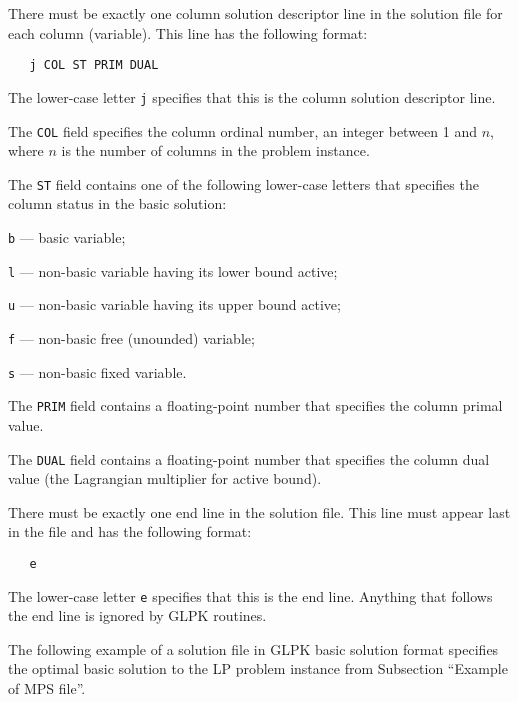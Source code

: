 There must be exactly one column
solution descriptor line in the solution file for each column
(variable). This line has the following format:

\begin{verbatim}
   j COL ST PRIM DUAL
\end{verbatim}

The lower-case letter \verb|j| specifies that this is the column
solution descriptor line.

The \verb|COL| field specifies the column ordinal number, an integer
between 1 and $n$, where $n$ is the number of columns in the problem
instance.

The \verb|ST| field contains one of the following lower-case letters
that specifies the column status in the basic solution:

\verb|b| --- basic variable;

\verb|l| --- non-basic variable having its lower bound active;

\verb|u| --- non-basic variable having its upper bound active;

\verb|f| --- non-basic free (unounded) variable;

\verb|s| --- non-basic fixed variable.

The \verb|PRIM| field contains a floating-point number that specifies
the column primal value.

The \verb|DUAL| field contains a floating-point number that specifies
the column dual value (the Lagrangian multiplier for active bound).

 There must be exactly one end line in the solution
file. This line must appear last in the file and has the following
format:

\begin{verbatim}
   e
\end{verbatim}

The lower-case letter \verb|e| specifies that this is the end line.
Anything that follows the end line is ignored by GLPK routines.


The following example of a solution file in GLPK basic solution format
specifies the optimal basic solution to the LP problem instance from
Subsection ``Example of MPS file''.

\bigskip

